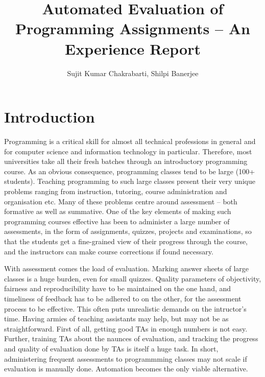 \documentclass{article}
\title{Automated Evaluation of Programming Assignments -- An Experience Report}
\author{Sujit Kumar Chakrabarti, Shilpi Banerjee}
\date{}
\begin{document}
\maketitle

\section{Introduction}
Programming is a critical skill for almost all technical professions in general and for computer science and information technology in particular. Therefore, most universities take all their fresh batches through an introductory programming course. As an obvious consequence, programming classes tend to be large (100+ students). Teaching programming to such large classes present their very unique problems ranging from instruction, tutoring, course administration and organisation etc. Many of these problems centre around assessment -- both formative as well as summative. One of the key elements of making such programming courses effective has been to administer a large number of assessments, in the form of assignments, quizzes, projects and examinations, so that the students get a fine-grained view of their progress through the course, and the instructors can make course corrections if found necessary.

With assessment comes the load of evaluation. Marking answer sheets of large classes is a huge burden, even for small quizzes. Quality parameters of objectivity, fairness and reproducibility have to be maintained on the one hand, and timeliness of feedback has to be adhered to on the other, for the assessment process to be effective. This often puts unrealistic demands on the intructor's time. Having armies of teaching assistants may help, but may not be as straightforward. First of all, getting good TAs in enough numbers is not easy. Further, training TAs about the naunces of evaluation, and tracking the progress and quality of evaluation done by TAs is itself a huge task. In short, administering frequent assessments to programmming classes may not scale if evaluation is manually done. Automation becomes the only viable alternative.
\end{document}
